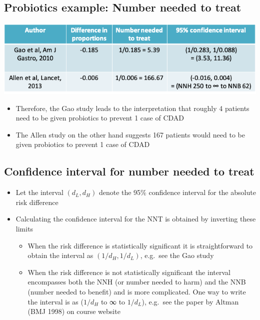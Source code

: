 \documentclass[
]{book}
\providecommand{\tightlist}{%
  \setlength{\itemsep}{0pt}\setlength{\parskip}{0pt}}
\begin{document}
\hypertarget{probiotics-example-number-needed-to-treat}{%
\subsection{Probiotics example: Number needed to treat}\label{probiotics-example-number-needed-to-treat}}

\includegraphics[width=1\linewidth]{./7_58}

\begin{itemize}
\tightlist
\item
  Therefore, the Gao study leads to the interpretation that roughly 4 patients need to be given probiotics to prevent 1 case of CDAD
\item
  The Allen study on the other hand suggests 167 patients would need to be given probiotics to prevent 1 case of CDAD
\end{itemize}

\hypertarget{confidence-interval-for-number-needed-to-treat}{%
\subsection{Confidence interval for number needed to treat}\label{confidence-interval-for-number-needed-to-treat}}

\begin{itemize}
\tightlist
\item
  Let the interval \((d_L, d_H)\) denote the 95\% confidence interval for the absolute risk difference
\item
  Calculating the confidence interval for the NNT is obtained by inverting these limits

  \begin{itemize}
  \tightlist
  \item
    When the risk difference is statistically significant it is straightforward to obtain the interval as \((1/d_H, 1/d_L)\), e.g.~see the Gao study
  \item
    When the risk difference is not statistically significant the interval encompasses both the NNH (or number needed to harm) and the NNB (number needed to benefit) and is more complicated. One way to write the interval is as (\(1/d_H\) to ∞ to \(1/d_L\)), e.g.~see the paper by Altman (BMJ 1998) on course website
  \end{itemize}
\end{itemize}
\end{document}
